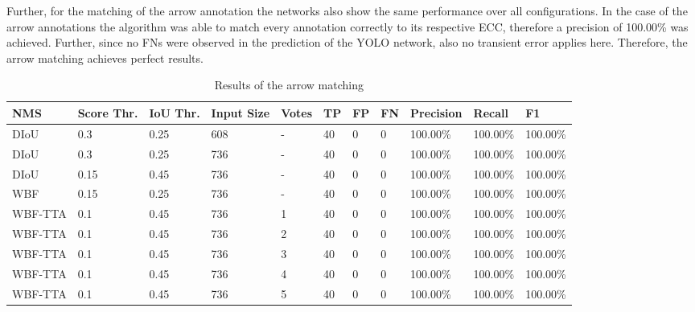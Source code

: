 Further, for the matching of the arrow annotation the networks also show the same performance over all configurations.
In the case of the arrow annotations the algorithm was able to match every annotation correctly to its respective \ac{ECC}, therefore a precision of 100.00\% was achieved.
Further, since no \acp{FN} were observed in the prediction of the \ac{YOLO} network, also no transient error applies here.
Therefore, the arrow matching achieves perfect results.

\begin{table}
\footnotesize
\begin{center}
\begin{tabular}{|l|l|l|l|l|l|l|l|l|l|l|}

\hline
NMS     & Score Thr. & IoU Thr. & Input Size & Votes & TP  & FP & FN & Precision & Recall   & F1       \\
\hline
DIoU    & 0.3        & 0.25     & 608        & -     & 40  & 0  & 0  & 100.00\%  & 100.00\% & 100.00\%  \\
\hline
DIoU    & 0.3        & 0.25     & 736        & -     & 40  & 0  & 0  & 100.00\%  & 100.00\% & 100.00\%  \\
\hline
DIoU    & 0.15       & 0.45     & 736        & -     & 40  & 0  & 0  & 100.00\%  & 100.00\% & 100.00\%  \\
\hline
WBF     & 0.15       & 0.25     & 736        & -     & 40  & 0  & 0  & 100.00\%  & 100.00\% & 100.00\%  \\
\hline
WBF-TTA & 0.1        & 0.45     & 736        & 1     & 40  & 0  & 0  & 100.00\%  & 100.00\% & 100.00\%  \\
\hline
WBF-TTA & 0.1        & 0.45     & 736        & 2     & 40  & 0  & 0  & 100.00\%  & 100.00\% & 100.00\%  \\
\hline
WBF-TTA & 0.1        & 0.45     & 736        & 3     & 40  & 0  & 0  & 100.00\%  & 100.00\% & 100.00\%  \\
\hline
WBF-TTA & 0.1        & 0.45     & 736        & 4     & 40  & 0  & 0  & 100.00\%  & 100.00\% & 100.00\%  \\
\hline
WBF-TTA & 0.1        & 0.45     & 736        & 5     & 40  & 0  & 0  & 100.00\%  & 100.00\% & 100.00\%  \\
\hline

\end{tabular}
\caption{Results of the arrow matching}
\label{tab:arrow_matching_results}
\end{center}
\end{table}
